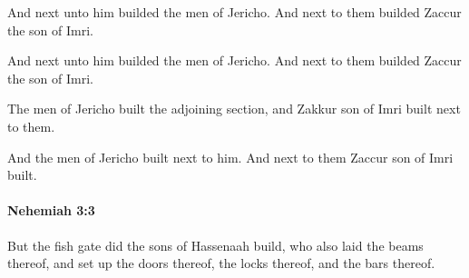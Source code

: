 			And next unto him builded the men of Jericho. And next to them builded Zaccur the son of Imri.

			\begin{versebox}
					\item[BHS] 
					\item[LXX] 
					\item[ASV] And next unto him builded the men of Jericho. And next to them builded Zaccur the son of Imri.
					\item[NIV] The men of Jericho built the adjoining section, and Zakkur son of Imri built next to them.
					\item[NRSV] And the men of Jericho built next to him. And next to them Zaccur son of Imri built.
			\end{versebox}

		\paragraph{Nehemiah 3:3} %
			\label{NEHEMIAH-3-3}

			But the fish gate did the sons of Hassenaah build, who also laid the beams thereof, and set up the doors thereof, the locks thereof, and the bars thereof.

